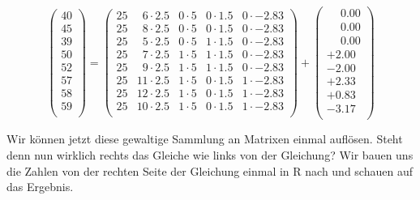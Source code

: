 \documentclass[
  letterpaper,
]{scrbook}
\begin{document}
\[
 \begin{pmatrix}
  40 \\
  45 \\
  39 \\
  50 \\
  52 \\
  57 \\
  58 \\
  59 \\
 \end{pmatrix}
 =
  \begin{pmatrix}
  25 & \phantom{0}6 \cdot 2.5 & 0 \cdot 5 & 0 \cdot 1.5& 0 \cdot -2.83 \\
  25 & \phantom{0}8 \cdot 2.5 & 0 \cdot 5 & 0 \cdot 1.5& 0 \cdot -2.83\\
  25 & \phantom{0}5 \cdot 2.5 & 0 \cdot 5 & 1 \cdot 1.5& 0 \cdot -2.83\\
  25 & \phantom{0}7 \cdot 2.5 & 1 \cdot 5 & 1 \cdot 1.5& 0 \cdot -2.83\\
  25 & \phantom{0}9 \cdot 2.5 & 1 \cdot 5 & 1 \cdot 1.5& 0 \cdot -2.83\\
  25 & 11\cdot 2.5 & 1 \cdot 5 & 0 \cdot 1.5& 1 \cdot -2.83\\
  25 & 12\cdot 2.5 & 1 \cdot 5 & 0 \cdot 1.5& 1 \cdot -2.83\\
  25 & 10\cdot 2.5 & 1 \cdot 5 & 0 \cdot 1.5& 1 \cdot -2.83\\
 \end{pmatrix} +
  \begin{pmatrix}
  \phantom{+}0.00 \\
  \phantom{+}0.00 \\
  \phantom{+}0.00 \\
  +2.00 \\
  -2.00 \\
  +2.33 \\
  +0.83 \\
  -3.17 \\
 \end{pmatrix}
\]

Wir können jetzt diese gewaltige Sammlung an Matrixen einmal auflösen.
Steht denn nun wirklich rechts das Gleiche wie links von der Gleichung?
Wir bauen uns die Zahlen von der rechten Seite der Gleichung einmal in R
nach und schauen auf das Ergebnis.
\end{document}
